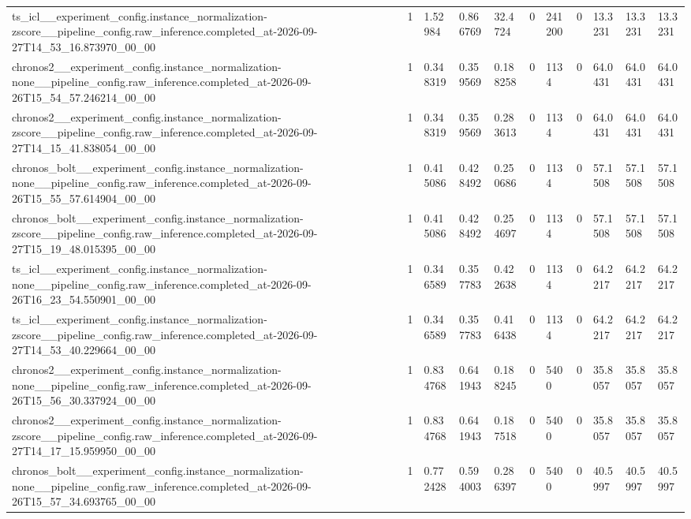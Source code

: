 \begin{tabular}{lllllllllll}
ts\_icl\_\_experiment\_config.instance\_normalization-zscore\_\_pipeline\_config.raw\_inference.completed\_at-2026-09-27T14\_53\_16.873970\_00\_00 & 1 & 1.52984 & 0.866769 & 32.4724 & 0 & 241200 & 0 & 13.3231 & 13.3231 & 13.3231 \\
chronos2\_\_experiment\_config.instance\_normalization-none\_\_pipeline\_config.raw\_inference.completed\_at-2026-09-26T15\_54\_57.246214\_00\_00 & 1 & 0.348319 & 0.359569 & 0.188258 & 0 & 1134 & 0 & 64.0431 & 64.0431 & 64.0431 \\
chronos2\_\_experiment\_config.instance\_normalization-zscore\_\_pipeline\_config.raw\_inference.completed\_at-2026-09-27T14\_15\_41.838054\_00\_00 & 1 & 0.348319 & 0.359569 & 0.283613 & 0 & 1134 & 0 & 64.0431 & 64.0431 & 64.0431 \\
chronos\_bolt\_\_experiment\_config.instance\_normalization-none\_\_pipeline\_config.raw\_inference.completed\_at-2026-09-26T15\_55\_57.614904\_00\_00 & 1 & 0.415086 & 0.428492 & 0.250686 & 0 & 1134 & 0 & 57.1508 & 57.1508 & 57.1508 \\
chronos\_bolt\_\_experiment\_config.instance\_normalization-zscore\_\_pipeline\_config.raw\_inference.completed\_at-2026-09-27T15\_19\_48.015395\_00\_00 & 1 & 0.415086 & 0.428492 & 0.254697 & 0 & 1134 & 0 & 57.1508 & 57.1508 & 57.1508 \\
ts\_icl\_\_experiment\_config.instance\_normalization-none\_\_pipeline\_config.raw\_inference.completed\_at-2026-09-26T16\_23\_54.550901\_00\_00 & 1 & 0.346589 & 0.357783 & 0.422638 & 0 & 1134 & 0 & 64.2217 & 64.2217 & 64.2217 \\
ts\_icl\_\_experiment\_config.instance\_normalization-zscore\_\_pipeline\_config.raw\_inference.completed\_at-2026-09-27T14\_53\_40.229664\_00\_00 & 1 & 0.346589 & 0.357783 & 0.416438 & 0 & 1134 & 0 & 64.2217 & 64.2217 & 64.2217 \\
chronos2\_\_experiment\_config.instance\_normalization-none\_\_pipeline\_config.raw\_inference.completed\_at-2026-09-26T15\_56\_30.337924\_00\_00 & 1 & 0.834768 & 0.641943 & 0.188245 & 0 & 5400 & 0 & 35.8057 & 35.8057 & 35.8057 \\
chronos2\_\_experiment\_config.instance\_normalization-zscore\_\_pipeline\_config.raw\_inference.completed\_at-2026-09-27T14\_17\_15.959950\_00\_00 & 1 & 0.834768 & 0.641943 & 0.187518 & 0 & 5400 & 0 & 35.8057 & 35.8057 & 35.8057 \\
chronos\_bolt\_\_experiment\_config.instance\_normalization-none\_\_pipeline\_config.raw\_inference.completed\_at-2026-09-26T15\_57\_34.693765\_00\_00 & 1 & 0.772428 & 0.594003 & 0.286397 & 0 & 5400 & 0 & 40.5997 & 40.5997 & 40.5997 \\

\end{tabular}
